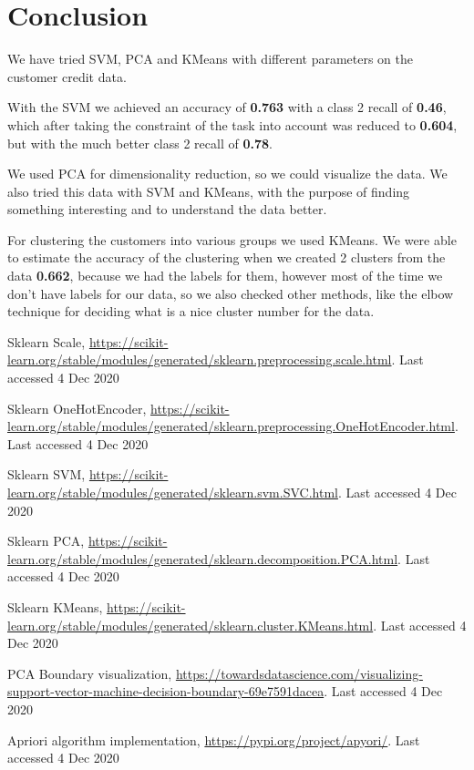 \documentclass[runningheads]{llncs}
\begin{document}
\section{Conclusion}

We have tried SVM, PCA and KMeans with different parameters on the customer credit data.

With the SVM we achieved an accuracy of \textbf{0.763} with a class 2 recall of \textbf{0.46}, which after taking the constraint of the task into account was reduced to \textbf{0.604}, but with the much better class 2 recall of \textbf{0.78}. 

We used PCA for dimensionality reduction, so we could visualize the data. We also tried this data with SVM and KMeans, with the purpose of finding something interesting and to understand the data better.

For clustering the customers into various groups we used KMeans. We were able to estimate the accuracy of the clustering when we created 2 clusters from the data \textbf{0.662}, because we had the labels for them, however most of the time we don't have labels for our data, so we also checked other methods, like the elbow technique for deciding what is a nice cluster number for the data.


%
%
% 
% 
%
\begin{thebibliography}{8}
Sklearn Scale, \url{https://scikit-learn.org/stable/modules/generated/sklearn.preprocessing.scale.html}. Last accessed 4 Dec 2020


Sklearn OneHotEncoder, \url{https://scikit-learn.org/stable/modules/generated/sklearn.preprocessing.OneHotEncoder.html}. Last accessed 4 Dec 2020

Sklearn SVM, \url{https://scikit-learn.org/stable/modules/generated/sklearn.svm.SVC.html}. Last accessed 4 Dec 2020

Sklearn PCA, \url{https://scikit-learn.org/stable/modules/generated/sklearn.decomposition.PCA.html}. Last accessed 4 Dec 2020

Sklearn KMeans, \url{https://scikit-learn.org/stable/modules/generated/sklearn.cluster.KMeans.html}. Last accessed 4 Dec 2020

PCA Boundary visualization, \url{https://towardsdatascience.com/visualizing-support-vector-machine-decision-boundary-69e7591dacea}. Last accessed 4 Dec 2020

Apriori algorithm implementation, \url{https://pypi.org/project/apyori/}. Last accessed 4 Dec 2020

\end{thebibliography}
\end{document}
